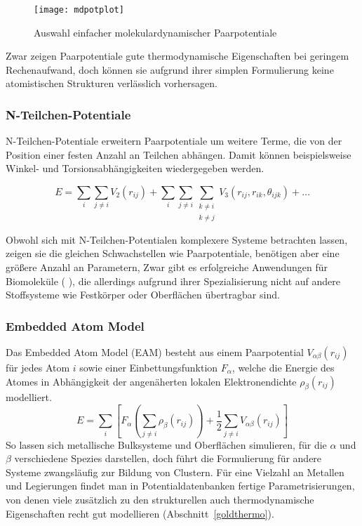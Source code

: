 \begin{figure}
  \centering
  \texttt{[image: mdpotplot]}
  \caption{Auswahl einfacher molekulardynamischer Paarpotentiale}
  \label{fig:mdpairpotentials}
\end{figure}

Zwar zeigen Paarpotentiale gute thermodynamische Eigenschaften bei geringem Rechenaufwand, doch können sie aufgrund ihrer simplen Formulierung keine atomistischen Strukturen verlässlich vorhersagen.

\subsubsection{N-Teilchen-Potentiale}

N-Teilchen-Potentiale erweitern Paarpotentiale um weitere Terme, die von der Position einer festen Anzahl an Teilchen abhängen.
Damit können beispielsweise Winkel- und Torsionsabhängigkeiten wiedergegeben werden.

\begin{equation}
  \label{eq:nbody-energy}
  E = \sum_i\sum_{j \neq i}{V_2\left(r_{ij}\right)} + \sum_i\sum_{j \neq i}\sum_{\substack{k \neq i \\ k \neq j}}{V_3\left(r_{ij}, r_{ik}, \theta_{ijk}\right)} + \dots
\end{equation}

Obwohl sich mit N-Teilchen-Potentialen komplexere Systeme betrachten lassen, zeigen sie die gleichen Schwachstellen wie Paarpotentiale, benötigen aber eine größere Anzahl an Parametern,
Zwar gibt es erfolgreiche Anwendungen für Biomoleküle (  ), die allerdings aufgrund ihrer Spezialisierung nicht auf andere Stoffsysteme wie Festkörper oder Oberflächen übertragbar sind.

\subsubsection{Embedded Atom Model}

Das Embedded Atom Model (EAM) besteht aus einem Paarpotential $V_{\alpha\beta}(r_{ij})$ für jedes Atom $i$ sowie einer Einbettungsfunktion $F_\alpha$, welche die Energie des Atomes in Abhängigkeit der angenäherten lokalen Elektronendichte $\rho_\beta(r_{ij})$ modelliert\cite{daw_embedded-atom_1984}.
\begin{equation}
  \label{eq:eam-energy}
  E = \sum_i\left[F_\alpha\left(\sum_{j\neq i}{\rho_\beta\left(r_{ij}\right)}\right) + \frac{1}{2}\sum_{j\neq i}{V_{\alpha\beta}\left(r_{ij}\right)}\right]
\end{equation}
So lassen sich metallische Bulksysteme und Oberflächen simulieren, für die $\alpha$ und $\beta$ verschiedene Spezies darstellen, doch führt die Formulierung für andere Systeme zwangsläufig zur Bildung von Clustern.
Für eine Vielzahl an Metallen und Legierungen findet man in Potentialdatenbanken fertige Parametrisierungen\cite{becker_interatomic_2014}, von denen viele zusätzlich zu den strukturellen auch thermodynamische Eigenschaften recht gut modellieren (Abschnitt~\ref{goldthermo}).

